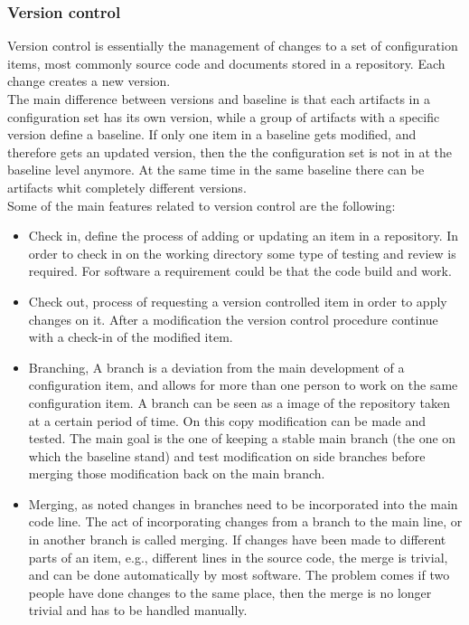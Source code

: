 \documentclass[../main.tex]{subfiles}
\begin{document}
\subsubsection{Version control}
Version control is essentially the management of changes to a set of configuration items, most commonly source code and documents stored in a repository. Each change creates a new version.\\ 
The main difference between versions and baseline is that each artifacts in a configuration set has its own version, while a group of artifacts with a specific version define a baseline. If only one item in a baseline gets modified, and therefore gets an updated version, then the the configuration set is not in at the baseline level anymore. At the same time in the same baseline there can be artifacts whit completely different versions.\\
Some of the main features related to version control are the following:
\begin{itemize}
    \item Check in, define the process of adding or updating an item in a repository. In order to check in on the working directory some type of testing and review is required. For software a requirement could be that the code build and work. 
    \item Check out, process of requesting a version controlled item in order to apply changes on it. After a modification the version control procedure continue with a check-in of the modified item. 
    \item Branching, A branch is a deviation from the main development of a configuration item, and allows for more than one person to work on the same configuration item. A branch can be seen as a image of the repository taken at a certain period of time. On this copy modification can be made and tested. The main goal is the one of keeping a stable main branch (the one on which the baseline stand) and test modification on side branches before merging those modification back on the main branch.
    \item Merging, as noted changes in branches need to be incorporated into the main code line. The act of incorporating changes from a branch to the main line, or in another branch is called merging. If changes have been made to different parts of an item, e.g., different lines in the source code, the merge is trivial, and can be done automatically by most software. The problem comes if two people have done changes to the same place, then the merge is no longer trivial and has to be handled manually.
\end{itemize}
\end{document}
